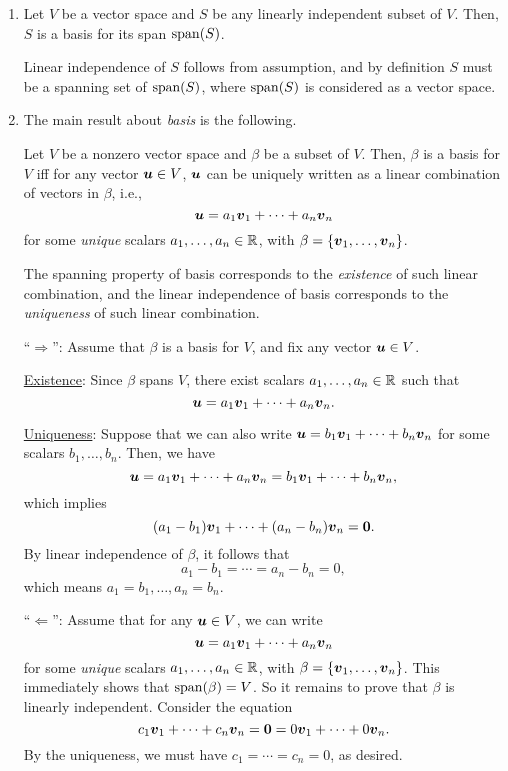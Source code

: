 \begin{enumerate}
\item Let \(V\) be a vector space and \(S\) be any linearly independent subset
of \(V\). Then, \(S\) is a basis for its span \(\operatorname{span}(S)\).

\begin{pf}
Linear independence of \(S\) follows from assumption, and by definition \(S\)
must be a spanning set of \(\operatorname{span}(S)\), where \(\operatorname{span}(S)\) is considered as a
vector space.
\end{pf}

\item The main result about \emph{basis} is the following.
\begin{theorem}
\label{thm:basis-unique-lin-comb}
Let \(V\) be a nonzero vector space and \(\beta\) be a subset of \(V\). Then,
\(\beta\) is a basis for \(V\) iff for any vector \(\vb*{u}\in V\),
\(\vb*{u}\) can be uniquely written as a linear combination of vectors in
\(\beta\), i.e.,
\[
\vb*{u}=a_1\vb*{v}_1+\dotsb+a_n\vb*{v}_n
\]
for some \emph{unique} scalars \(a_1,\dotsc,a_n\in\mathbb{R}\), with
\(\beta=\{\vb*{v}_1,\dotsc,\vb*{v}_n\}\).
\end{theorem}
\begin{intuition}
The spanning property of basis corresponds to the \emph{existence} of such
linear combination, and the linear independence of basis corresponds to the
\emph{uniqueness} of such linear combination.
\end{intuition}

\begin{pf}
``\(\Rightarrow\)'': Assume that \(\beta\) is a basis for \(V\), and fix any
vector \(\vb*{u}\in V\).

\underline{Existence}: Since \(\beta\) spans \(V\), there exist scalars
\(a_1,\dotsc,a_n\in\mathbb{R}\) such that
\[
\vb*{u}=a_1\vb*{v}_1+\dotsb+a_n\vb*{v}_n.
\]

\underline{Uniqueness}: Suppose that we can also write
\(\vb*{u}=b_1\vb*{v}_1+\dotsb+b_n\vb*{v}_n\) for some scalars
\(b_1,\dotsc,b_n\). Then, we have
\[
\vb*{u}=a_1\vb*{v}_1+\dotsb+a_n\vb*{v}_n=b_1\vb*{v}_1+\dotsb+b_n\vb*{v}_n,
\]
which implies
\[
(a_1-b_1)\vb*{v}_1+\dotsb+(a_n-b_n)\vb*{v}_n=\vb*{0}.
\]
By linear independence of \(\beta\), it follows that
\[
a_1-b_1=\dotsb=a_n-b_n=0,
\]
which means \(a_1=b_1,\dotsc,a_n=b_n\).

``\(\Leftarrow\)'': Assume that for any \(\vb*{u}\in V\), we can write
\[
\vb*{u}=a_1\vb*{v}_1+\dotsb+a_n\vb*{v}_n
\]
for some \emph{unique} scalars \(a_1,\dotsc,a_n\in\mathbb{R}\), with
\(\beta=\{\vb*{v}_1,\dotsc,\vb*{v}_n\}\). This immediately shows that
\(\operatorname{span}(\beta)=V\). So it remains to prove that \(\beta\) is linearly
independent. Consider the equation
\[
c_1\vb*{v}_1+\dotsb+c_n\vb*{v}_n=\vb*{0}=0\vb*{v}_1+\dotsb+0\vb*{v}_n.
\]
By the uniqueness, we must have \(c_1=\dotsb=c_n=0\), as desired.
\end{pf}
\end{enumerate}
